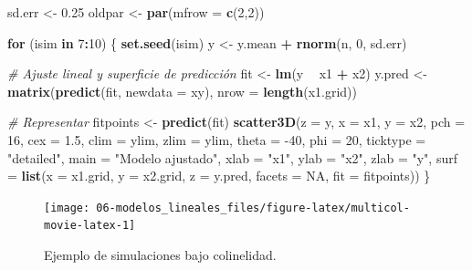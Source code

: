 \documentclass[
  spanish,
]{book}
\newenvironment{Shaded}{\begin{snugshade}}{\end{snugshade}}
\newcommand{\CommentTok}[1]{\textcolor[rgb]{0.56,0.35,0.01}{\textit{#1}}}
\newcommand{\ControlFlowTok}[1]{\textcolor[rgb]{0.13,0.29,0.53}{\textbf{#1}}}
\newcommand{\DataTypeTok}[1]{\textcolor[rgb]{0.13,0.29,0.53}{#1}}
\newcommand{\DecValTok}[1]{\textcolor[rgb]{0.00,0.00,0.81}{#1}}
\newcommand{\FloatTok}[1]{\textcolor[rgb]{0.00,0.00,0.81}{#1}}
\newcommand{\KeywordTok}[1]{\textcolor[rgb]{0.13,0.29,0.53}{\textbf{#1}}}
\newcommand{\NormalTok}[1]{#1}
\newcommand{\OperatorTok}[1]{\textcolor[rgb]{0.81,0.36,0.00}{\textbf{#1}}}
\newcommand{\OtherTok}[1]{\textcolor[rgb]{0.56,0.35,0.01}{#1}}
\newcommand{\StringTok}[1]{\textcolor[rgb]{0.31,0.60,0.02}{#1}}
\theoremstyle{break}
\theoremstyle{definition}
\theoremstyle{definition}
\theoremstyle{definition}
\theoremstyle{remark}
\begin{document}
\begin{Shaded}
\begin{Highlighting}[]
\NormalTok{sd.err <-}\StringTok{ }\FloatTok{0.25}
\NormalTok{oldpar <-}\StringTok{ }\KeywordTok{par}\NormalTok{(}\DataTypeTok{mfrow =} \KeywordTok{c}\NormalTok{(}\DecValTok{2}\NormalTok{,}\DecValTok{2}\NormalTok{))}

\ControlFlowTok{for}\NormalTok{ (isim }\ControlFlowTok{in} \DecValTok{7}\OperatorTok{:}\DecValTok{10}\NormalTok{) \{}
  \KeywordTok{set.seed}\NormalTok{(isim)}
\NormalTok{  y <-}\StringTok{ }\NormalTok{y.mean }\OperatorTok{+}\StringTok{ }\KeywordTok{rnorm}\NormalTok{(n, }\DecValTok{0}\NormalTok{, sd.err)}
  
  \CommentTok{# Ajuste lineal y superficie de predicción}
\NormalTok{  fit <-}\StringTok{ }\KeywordTok{lm}\NormalTok{(y }\OperatorTok{~}\StringTok{ }\NormalTok{x1 }\OperatorTok{+}\StringTok{ }\NormalTok{x2)}
\NormalTok{  y.pred <-}\StringTok{ }\KeywordTok{matrix}\NormalTok{(}\KeywordTok{predict}\NormalTok{(fit, }\DataTypeTok{newdata =}\NormalTok{ xy), }\DataTypeTok{nrow =} \KeywordTok{length}\NormalTok{(x1.grid)) }
  
  \CommentTok{# Representar}
\NormalTok{  fitpoints <-}\StringTok{ }\KeywordTok{predict}\NormalTok{(fit) }
  \KeywordTok{scatter3D}\NormalTok{(}\DataTypeTok{z =}\NormalTok{ y, }\DataTypeTok{x =}\NormalTok{ x1, }\DataTypeTok{y =}\NormalTok{ x2, }\DataTypeTok{pch =} \DecValTok{16}\NormalTok{, }\DataTypeTok{cex =} \FloatTok{1.5}\NormalTok{, }\DataTypeTok{clim =}\NormalTok{ ylim, }\DataTypeTok{zlim =}\NormalTok{ ylim,}
            \DataTypeTok{theta =} \DecValTok{-40}\NormalTok{, }\DataTypeTok{phi =} \DecValTok{20}\NormalTok{, }\DataTypeTok{ticktype =} \StringTok{"detailed"}\NormalTok{, }
            \DataTypeTok{main =} \StringTok{"Modelo ajustado"}\NormalTok{, }\DataTypeTok{xlab =} \StringTok{"x1"}\NormalTok{, }\DataTypeTok{ylab =} \StringTok{"x2"}\NormalTok{, }\DataTypeTok{zlab =} \StringTok{"y"}\NormalTok{, }
            \DataTypeTok{surf =} \KeywordTok{list}\NormalTok{(}\DataTypeTok{x =}\NormalTok{ x1.grid, }\DataTypeTok{y =}\NormalTok{ x2.grid, }\DataTypeTok{z =}\NormalTok{ y.pred, }
                        \DataTypeTok{facets =} \OtherTok{NA}\NormalTok{, }\DataTypeTok{fit =}\NormalTok{ fitpoints))}
\NormalTok{\}}
\end{Highlighting}
\end{Shaded}

\begin{figure}[!htb]

{\centering \texttt{[image: 06-modelos\_lineales\_files/figure-latex/multicol-movie-latex-1]} 

}

\caption{Ejemplo de simulaciones bajo colinelidad.}\label{fig:multicol-movie-latex}
\end{figure}
\end{document}
